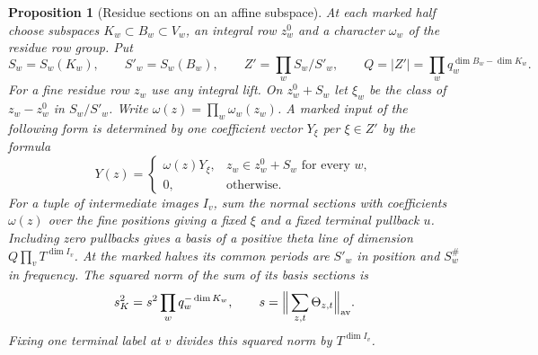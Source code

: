 \documentclass[a4paper,11pt]{article}
\newtheorem{proposition}{Proposition}[section]
\theoremstyle{definition}
\theoremstyle{remark}
\numberwithin{equation}{section}
\begin{document}
\begin{proposition}[Residue sections on an affine subspace]
\label{prop:markedline394}
At each marked half choose subspaces \(K_w\subset B_w\subset V_w\),
an integral row \(z_w^0\) and a character \(\omega_w\) of the
residue row group. Put
\[
 S_w=S_w(K_w),\qquad S'_w=S_w(B_w),\qquad
 Z'=\prod_w S_w/S'_w,\qquad
 Q=|Z'|=\prod_w q_w^{\dim B_w-\dim K_w}.
\]
For a fine residue row \(z_w\) use any integral lift. On
\(z_w^0+S_w\) let \(\xi_w\) be the class of \(z_w-z_w^0\)
in \(S_w/S'_w\). Write \(\omega(z)=\prod_w\omega_w(z_w)\).
A marked input of the following form is determined by one
coefficient vector \(Y_\xi\) per \(\xi\in Z'\) by the formula
\[
 Y(z)=
 \begin{cases}
   \omega(z)Y_\xi,&z_w\in z_w^0+S_w\text{ for every }w,\\
   0,&\text{otherwise}.
 \end{cases}
\]
For a tuple of intermediate images \(I_v\), sum the normal sections
with coefficients \(\omega(z)\) over the fine positions giving
a fixed \(\xi\) and a fixed terminal pullback \(u\).
Including zero pullbacks gives a basis of a positive theta line
of dimension \(Q\prod_v T^{\dim I_v}\). At the marked halves its
common periods are \(S'_w\) in position and \(S_w^\#\) in
frequency. The squared norm of the sum of its basis sections is
\[
          s_K^2=s^2\prod_w q_w^{-\dim K_w},
          \qquad s=\Big\|\sum_{z,t}\Theta_{z,t}\Big\|_{\rm av}.
\]
Fixing one terminal label at \(v\) divides this squared norm
by \(T^{\dim I_v}\).
\end{proposition}
\end{document}
